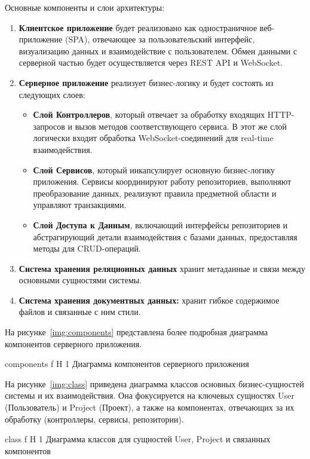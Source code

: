 Основные компоненты и слои архитектуры:

\begin{enumerate}[wide=12.5mm, leftmargin=12.5mm]
    \item \textbf{Клиентское приложение} будет реализовано как одностраничное веб-приложение (SPA), отвечающее за пользовательский интерфейс, визуализацию данных и взаимодействие с пользователем. Обмен данными с серверной частью будет осуществляется через REST API и WebSocket.
    \item \textbf{Серверное приложение} реализует бизнес-логику и будет состоять из следующих слоев:
        \begin{itemize}
            \item \textbf{Слой Контроллеров}, который отвечает за обработку входящих HTTP-запросов и вызов методов соответствующего сервиса. В этот же слой логически входит обработка WebSocket-соединений для real-time взаимодействия.
            \item \textbf{Слой Сервисов}, который инкапсулирует основную бизнес-логику приложения. Сервисы координируют работу репозиториев, выполняют преобразование данных, реализуют правила предметной области и управляют транзакциями.
            \item \textbf{Слой Доступа к Данным}, включающий интерфейсы репозиториев и абстрагирующий детали взаимодействия с базами данных, предоставляя методы для CRUD-операций.
        \end{itemize}
    \item \textbf{Система хранения реляционных данных} хранит метаданные и связи между основными сущностями системы.
    \item \textbf{Система хранения документных данных:} хранит гибкое содержимое файлов и связанные с ним стили.
\end{enumerate}

На рисунке~\ref{img:components} представлена более подробная диаграмма компонентов серверного приложения.

	{components}
	{f}
	{H}
	{1\textwidth}
	{Диаграмма компонентов серверного приложения}

\clearpage

На рисунке~\ref{img:class} приведена диаграмма классов основных бизнес-сущностей системы и их взаимодействия.
Она фокусируется на ключевых сущностях User (Пользователь) и Project (Проект), а также на компонентах, отвечающих за их обработку (контроллеры, сервисы, репозитории).

	{class}
	{f}
	{H}
	{1\textwidth}
	{Диаграмма классов для сущностей User, Project и связанных компонентов}

